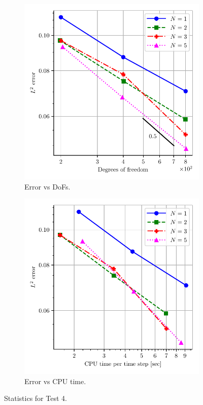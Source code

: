 \documentclass[a4paper,11pt,oneside]{article}
\begin{document}
\begin{figure}[htbp]
	\centering
	\begin{subfigure}{0.5\linewidth}
		\includegraphics[width=\linewidth]{figures/riemann_1d/test1-4/error_vs_dof_chandrashekhar.pdf}
		\caption{Error vs DoFs.}
		\label{subfig:test1-4_error_vs_dof_chandrashekhar}
	\end{subfigure}%
	\begin{subfigure}{0.5\linewidth}
		\includegraphics[width=\linewidth]{figures/riemann_1d/test1-4/error_vs_cputime_chandrashekhar.pdf}
		\caption{Error vs CPU time.}
		\label{subfig:test1-4_error_vs_cputime_chandrashekhar}
	\end{subfigure}
	\caption{Statistics for Test 4.}
	\label{fig:test1-4_error_plots_chandrashekhar}
\end{figure}
\end{document}

